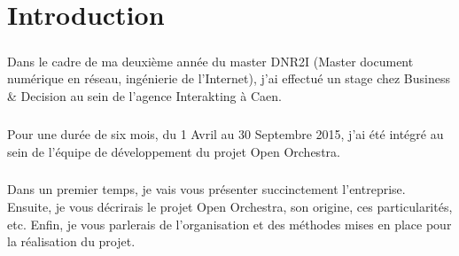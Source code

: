 \chapter*{Introduction}
        \paragraph{}
         Dans le cadre de ma deuxième année du master DNR2I (Master document numérique en réseau, ingénierie de l'Internet), j'ai effectué un stage chez Business \& Decision au sein de l'agence Interakting à Caen.
         \paragraph{}
          Pour une durée de six mois, du 1 Avril au 30 Septembre 2015, j'ai été intégré au sein de l'équipe de développement du projet Open Orchestra.
         \paragraph{}
         Dans un premier temps, je vais vous présenter succinctement l'entreprise. Ensuite, je vous décrirais le projet Open Orchestra, son origine, ces particularités, etc. Enfin, je vous parlerais de l'organisation et des méthodes mises en place pour la réalisation du projet.
